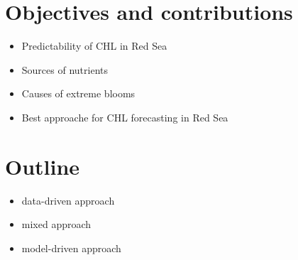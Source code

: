 \section{Objectives and contributions}
\label{intro:objectives}

	\begin{itemize}
		\item Predictability of CHL in Red Sea
		\item Sources of nutrients
		\item Causes of extreme blooms
		\item Best approache for CHL forecasting in Red Sea
	\end{itemize}

\section{Outline}
\label{intro:outline}

	\begin{itemize}
		\item data-driven approach
		\item mixed approach
		\item model-driven approach
	\end{itemize}
